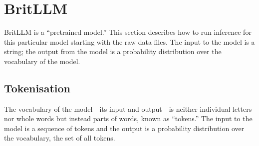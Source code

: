 \documentclass[11pt, a4paper]{article}
\begin{document}
\section{BritLLM}

BritLLM is a ``pretrained model.'' This section describes how to run
inference for this particular model starting with the raw data
files. The input to the model is a string; the output from the model
is a probability distribution over the vocabulary of the model.

\subsection{Tokenisation}

The vocabulary of the model---its input and output---is neither
individual letters nor whole words but instead parts of words, known
as ``tokens.'' The input to the model is a sequence of tokens and the
output is a probability distribution over the vocabulary, the set of
all tokens.
\end{document}
